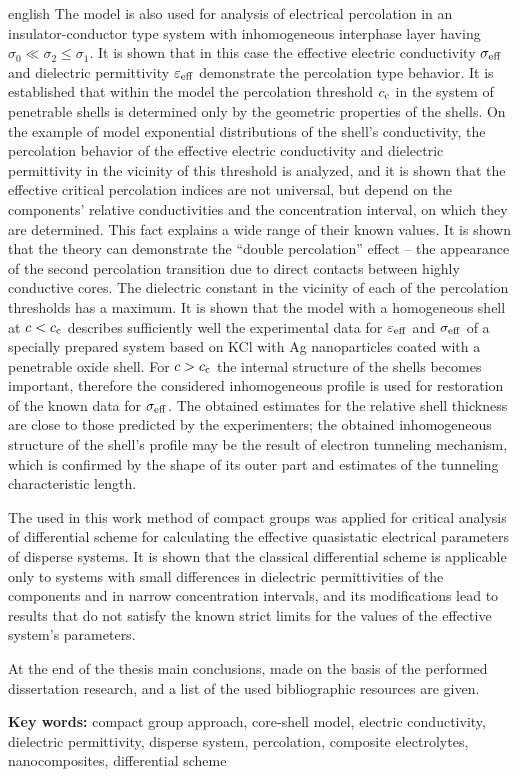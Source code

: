 \begin{otherlanguage*}{english}
The model is also used for analysis of electrical percolation in an insulator-conductor type system with inhomogeneous interphase layer having $ \sigma_0 \ll \sigma_2 \leq \sigma_1 $. It is shown that in this case the effective electric conductivity $ \sigma _ {\rm eff} $ and dielectric permittivity $ \varepsilon _ {\rm eff} $ demonstrate the percolation type behavior.
It is established that within the model the percolation threshold $ c _ {\rm c} $ in the system of penetrable shells is determined only by the geometric properties of the shells.  On the example of model exponential distributions of the shell's conductivity, the percolation behavior of the effective electric conductivity and dielectric permittivity in the vicinity of this threshold is analyzed, and it is shown that the effective critical percolation indices are not universal, but depend on the components' relative conductivities and the concentration interval, on which they are determined. This fact explains a wide range of their known values.
It is shown that the theory can demonstrate the ``double percolation'' effect -- the appearance of the second percolation transition due to direct contacts between highly conductive cores. The dielectric constant in the vicinity of each of the percolation thresholds has a maximum.
It is shown that the model with a homogeneous shell at $ c <c _ {\rm c} $ describes sufficiently well the experimental data for $ \varepsilon _ {\rm eff} $ and $ \sigma _ {\rm eff} $ of a specially prepared system based on KCl with Ag nanoparticles coated with a penetrable oxide shell. For $ c> c _ {\rm c} $ the internal structure of the shells becomes important, therefore the considered inhomogeneous profile is used for restoration of the known data for $ \sigma _ {\rm eff} $. The obtained estimates for the relative shell thickness are close to those predicted by the experimenters; the obtained inhomogeneous structure of the shell's profile may be the result of electron tunneling mechanism, which is confirmed by the shape of its outer part and estimates of the tunneling characteristic length.

The used in this work method of compact groups was applied for critical analysis of differential scheme for calculating the effective quasistatic electrical parameters of disperse systems. It is shown that the classical differential scheme is applicable only to systems with small differences in dielectric permittivities of the components and in narrow concentration intervals, and its modifications lead to results that do not satisfy the known strict limits for the values of the effective system's parameters.

At the end of the thesis main conclusions, made on the basis of the performed dissertation research, and a list of the used bibliographic resources are given.

\vskip 15pt
\textbf{Key words:} compact group approach, core-shell model, electric conductivity, dielectric permittivity, disperse system, percolation, composite electrolytes, nanocomposites, differential scheme

\end{otherlanguage*}